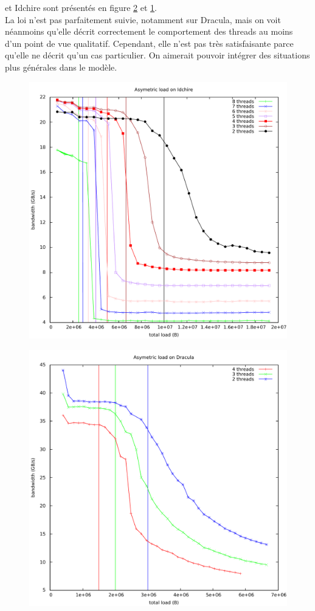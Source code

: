\documentclass{report}
\begin{document}
et Idchire sont présentés en figure \ref{fig:dracasbench} et \ref{fig:idchasbench}. 
\\La loi n'est pas parfaitement suivie, notamment sur Dracula, mais on voit néanmoins qu'elle
décrit correctement le comportement des threads au moins d'un point de vue qualitatif. Cependant,
elle n'est pas très satisfaisante parce qu'elle ne décrit qu'un cas particulier. On aimerait
pouvoir intégrer des situations plus générales dans le modèle.
\begin{figure}[H]
  \includegraphics[width=\linewidth]{bw-asym-idchire.pdf}
  \label{fig:idchasbench}
\end{figure}
\begin{figure}[H]
  \includegraphics[width=\linewidth]{bench-asym-dracula.pdf}
  \label{fig:dracasbench}
\end{figure}
\end{document}

